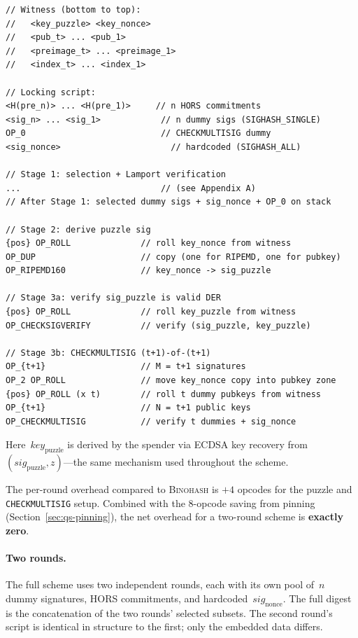 \documentclass[11pt, a4paper]{article}
\begin{document}
\begin{lstlisting}[language={}, numbers=none]
// Witness (bottom to top):
//   <key_puzzle> <key_nonce>
//   <pub_t> ... <pub_1>
//   <preimage_t> ... <preimage_1>
//   <index_t> ... <index_1>

// Locking script:
<H(pre_n)> ... <H(pre_1)>     // n HORS commitments
<sig_n> ... <sig_1>            // n dummy sigs (SIGHASH_SINGLE)
OP_0                           // CHECKMULTISIG dummy
<sig_nonce>                      // hardcoded (SIGHASH_ALL)

// Stage 1: selection + Lamport verification
...                            // (see Appendix A)
// After Stage 1: selected dummy sigs + sig_nonce + OP_0 on stack

// Stage 2: derive puzzle sig
{pos} OP_ROLL              // roll key_nonce from witness
OP_DUP                     // copy (one for RIPEMD, one for pubkey)
OP_RIPEMD160               // key_nonce -> sig_puzzle

// Stage 3a: verify sig_puzzle is valid DER
{pos} OP_ROLL              // roll key_puzzle from witness
OP_CHECKSIGVERIFY          // verify (sig_puzzle, key_puzzle)

// Stage 3b: CHECKMULTISIG (t+1)-of-(t+1)
OP_{t+1}                   // M = t+1 signatures
OP_2 OP_ROLL               // move key_nonce copy into pubkey zone
{pos} OP_ROLL (x t)        // roll t dummy pubkeys from witness
OP_{t+1}                   // N = t+1 public keys
OP_CHECKMULTISIG           // verify t dummies + sig_nonce
\end{lstlisting}

\noindent Here~$\mathit{key}_{\mathrm{puzzle}}$ is derived by the spender via ECDSA key recovery from~$(\mathit{sig}_{\mathrm{puzzle}}, z)$---the same mechanism used throughout the scheme.

The per-round overhead compared to \textsc{Binohash} is $+4$ opcodes for the puzzle and \texttt{CHECKMULTISIG} setup. Combined with the 8-opcode saving from pinning (Section~\ref{sec:qs-pinning}), the net overhead for a two-round scheme is \textbf{exactly zero}.

\paragraph{Two rounds.}
The full scheme uses two independent rounds, each with its own pool of~$n$ dummy signatures, HORS commitments, and hardcoded~$\mathit{sig}_{\mathrm{nonce}}$. The full digest is the concatenation of the two rounds' selected subsets. The second round's script is identical in structure to the first; only the embedded data differs.
\end{document}
